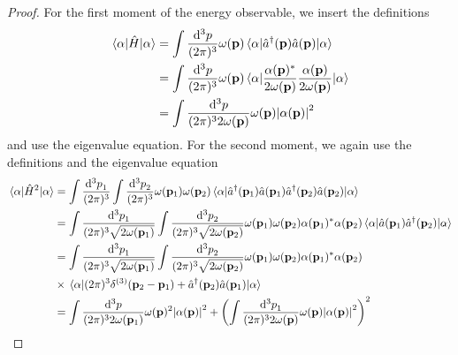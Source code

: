 \qkgcoherentenergy
\begin{proof}
	For the first moment of the energy observable, we insert the definitions
	\begin{equation*}
		\begin{split}
			\expval{\hat{H}}{\alpha}
			&=
			\int\frac{\dd[3]{p}}{(2\pi)^3}
			\omega(\vb{p})
			\expval{\hat{a}^\dagger(\vb{p})\hat{a}(\vb{p})}{\alpha}
			\\
			&=
			\int\frac{\dd[3]{p}}{(2\pi)^3}
			\omega(\vb{p})
			\expval{\frac{\alpha(\vb{p})^*}{2\omega(\vb{p})}\frac{\alpha(\vb{p})}{2\omega(\vb{p})}}{\alpha}
			\\
			&=
			\int\frac{\dd[3]{p}}{(2\pi)^32\omega(\vb{p})}
			\omega(\vb{p})
			\abs{\alpha(\vb{p})}^2
		\end{split}
	\end{equation*}
	and use the eigenvalue equation. For the second moment, we again use the definitions and the eigenvalue equation
	\begin{equation*}
		\begin{split}
			\expval{\hat{H}^2}{\alpha}
			&=
			\int\frac{\dd[3]{p}_1}{(2\pi)^3}
			\int\frac{\dd[3]{p}_2}{(2\pi)^3}
			\omega(\vb{p}_1)
			\omega(\vb{p}_2)
			\expval{
				\hat{a}^\dagger(\vb{p}_1)
				\hat{a}(\vb{p}_1)
				\hat{a}^\dagger(\vb{p}_2)
				\hat{a}(\vb{p}_2)
			}{\alpha}
			\\
			&=
			\int\frac{\dd[3]{p}_1}{(2\pi)^3\sqrt{2\omega(\vb{p}_1)}}
			\int\frac{\dd[3]{p}_2}{(2\pi)^3\sqrt{2\omega(\vb{p}_2)}}
			\omega(\vb{p}_1)
			\omega(\vb{p}_2)
			\alpha(\vb{p}_1)^*
			\alpha(\vb{p}_2)
			\expval{
				\hat{a}(\vb{p}_1)
				\hat{a}^\dagger(\vb{p}_2)
			}{\alpha}
			\\
			&=
			\int\frac{\dd[3]{p}_1}{(2\pi)^3\sqrt{2\omega(\vb{p}_1)}}
			\int\frac{\dd[3]{p}_2}{(2\pi)^3\sqrt{2\omega(\vb{p}_2)}}
			\omega(\vb{p}_1)
			\omega(\vb{p}_2)			
			\alpha(\vb{p}_1)^*
			\alpha(\vb{p}_2)
			\\
			&\times
			\expval{
				(2\pi)^3
				\delta^{(3)}(\vb{p}_2-\vb{p}_1)
				+
				\hat{a}^\dagger(\vb{p}_2)
				\hat{a}(\vb{p}_1)
			}{\alpha}
			\\
			&=
			\int\frac{\dd[3]{p}}{(2\pi)^32\omega(\vb{p}_1)}
			\omega(\vb{p})^2
			\abs{\alpha(\vb{p})}^2
			+
			\left(
				\int\frac{\dd[3]{p}_1}{(2\pi)^32\omega(\vb{p})}
				\omega(\vb{p})
				\abs{\alpha(\vb{p})}^2
			\right)^2
		\end{split}
	\end{equation*}
\end{proof}

